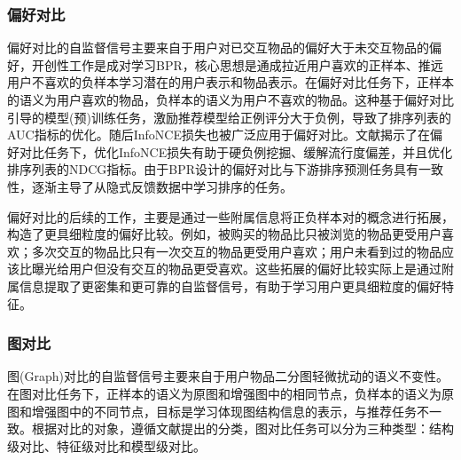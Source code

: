 \subsubsection{偏好对比}
偏好对比的自监督信号主要来自于用户对已交互物品的偏好大于未交互物品的偏好，开创性工作是成对学习BPR\cite{Steffen:2009:UAI}，核心思想是通成拉近用户喜欢的正样本、推远用户不喜欢的负样本学习潜在的用户表示和物品表示。在偏好对比任务下，正样本的语义为用户喜欢的物品，负样本的语义为用户不喜欢的物品。这种基于偏好对比引导的模型(预)训练任务，激励推荐模型给正例评分大于负例，导致了排序列表的AUC指标的优化\cite{Steffen:2009:UAI}。随后InfoNCE损失\cite{Oord:2018:arxiv}也被广泛应用于偏好对比。文献\cite{Jiancan:2022:arxiv}揭示了在偏好对比任务下，优化InfoNCE损失有助于硬负例挖掘、缓解流行度偏差，并且优化排序列表的NDCG指标。由于BPR设计的偏好对比与下游排序预测任务具有一致性，逐渐主导了从隐式反馈数据中学习排序的任务\cite{Steffen:2014:WSDM,Xiangnan:2020:SIGIR,Wang:2019:SIGIR}。


偏好对比的后续的工作，主要是通过一些附属信息将正负样本对的概念进行拓展，构造了更具细粒度的偏好比较\cite{Weike:2013:IJCAI,Yu:2018:CIKM,Xiaoye:2011:MathProg,Xuejiao:2020:ASC,Qiu:2018:IS,Zhao:2019:FGCS}。例如，被购买的物品比只被浏览的物品更受用户喜欢\cite{Qiu:2018:IS}；多次交互的物品比只有一次交互的物品更受用户喜欢\cite{Lerche:2014:RS}；用户未看到过的物品应该比曝光给用户但没有交互的物品更受喜欢\cite{Wenhui:2019:WWW,Yu:2018:CIKM,Bin:2020:IS}。这些拓展的偏好比较实际上是通过附属信息提取了更密集和更可靠的自监督信号，有助于学习用户更具细粒度的偏好特征。


\subsubsection{图对比}
图(Graph)对比的自监督信号主要来自于用户物品二分图轻微扰动的语义不变性。在图对比任务下，正样本的语义为原图和增强图中的相同节点，负样本的语义为原图和增强图中的不同节点，目标是学习体现图结构信息的表示，与推荐任务不一致。根据对比的对象，遵循文献\cite{wu:2023:TKDE,gsl:2023:TKDE}提出的分类，图对比任务可以分为三种类型：结构级对比、特征级对比和模型级对比。



